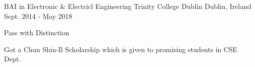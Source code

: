 


\begin{cventries}

  \cventry
    {BAI in Electronic \& Electricl Engineering} %
    {Trinity College Dublin} %
    {Dublin, Ireland} %
    {Sept. 2014 - May 2018} %
    {
      Pass with Distinction
      \begin{cvitems} %
        \item {Got a Chun Shin-Il Scholarship which is given to promising students in CSE Dept.}
      \end{cvitems}
    }

\end{cventries}
